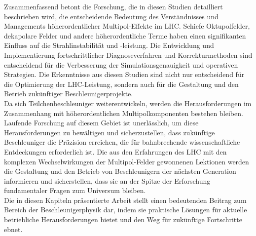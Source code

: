{%
Zusammenfassend betont die Forschung, die in diesen Studien detailliert beschrieben wird, die
entscheidende Bedeutung des Verständnisses und Managements höherordentlicher Multipol-Effekte im
LHC. Schiefe Oktupolfelder, dekapolare Felder und andere höherordentliche Terme haben einen
signifikanten Einfluss auf die Strahlinstabilität und -leistung. Die Entwicklung und Implementierung
fortschrittlicher Diagnoseverfahren und Korrekturmethoden sind entscheidend für die Verbesserung der
Simulationsgenauigkeit und operativen Strategien. Die Erkenntnisse aus diesen Studien sind nicht nur
entscheidend für die Optimierung der LHC-Leistung, sondern auch für die Gestaltung und den Betrieb
zukünftiger Beschleunigerprojekte.\\
\indent
Da sich Teilchenbeschleuniger weiterentwickeln, werden die Herausforderungen im Zusammenhang mit
höherordentlichen Multipolkomponenten bestehen bleiben. Laufende Forschung auf diesem Gebiet ist
unerlässlich, um diese Herausforderungen zu bewältigen und sicherzustellen, dass zukünftige
Beschleuniger die Präzision erreichen, die für bahnbrechende wissenschaftliche Entdeckungen
erforderlich ist. Die aus den Erfahrungen des LHC mit den komplexen Wechselwirkungen der
Multipol-Felder gewonnenen Lektionen werden die Gestaltung und den Betrieb von Beschleunigern der
nächsten Generation informieren und sicherstellen, dass sie an der Spitze der Erforschung
fundamentaler Fragen zum Universum bleiben.\\
\indent
Die in diesen Kapiteln präsentierte Arbeit stellt einen bedeutenden Beitrag zum Bereich der
Beschleunigerphysik dar, indem sie praktische Lösungen für aktuelle betriebliche Herausforderungen
bietet und den Weg für zukünftige Fortschritte ebnet.

}